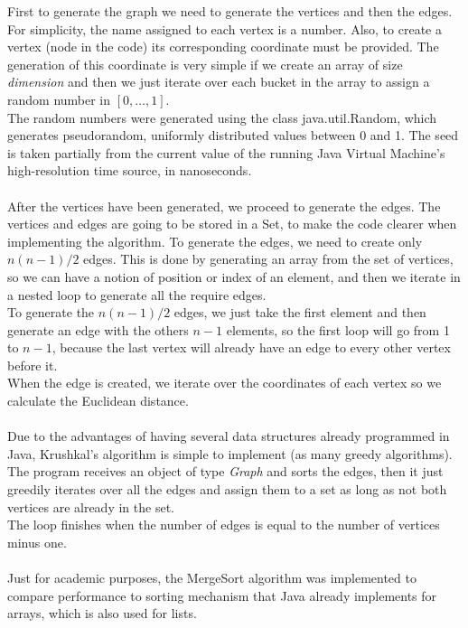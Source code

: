 \documentclass[tikz, 12pt]{scrartcl}
\begin{document}
First to generate the graph we need to generate the vertices and then the edges. For simplicity, the name assigned to each vertex is a number. Also, to create a vertex (node in the code) its corresponding coordinate must be provided. The generation of this coordinate is very simple if we create an array of size \textit{dimension} and then we just iterate over each bucket in the array to assign a random number in $[0, \ldots, 1].$\\
The random numbers were generated using the class java.util.Random, which generates pseudorandom, uniformly distributed  values between 0 and 1. The seed is taken partially from the current value of the running Java Virtual Machine's high-resolution time source, in nanoseconds.\\
\\
After the vertices have been generated, we proceed to generate the edges. The vertices and edges are going to be stored in a Set, to make the code clearer when implementing the algorithm. To generate the edges, we need to create only $n(n-1)/2$ edges. This is done by generating an array from the set of vertices, so we can have a notion of position or index of an element, and then we iterate in a nested loop to generate all the require edges.\\
To generate the $n(n-1 ) /2$ edges, we just take the first element and then generate an edge with the others $n - 1$ elements, so the first loop will go from 1 to $n -1$, because the last vertex will already have an edge to every other vertex before it. \\
When the edge is created, we iterate over the coordinates of each vertex so we calculate the Euclidean distance.\\
\\
Due to the advantages of having several data structures already programmed in Java, Krushkal's algorithm is simple to implement (as many greedy algorithms). The program receives an object of type \textit{Graph} and sorts the edges, then it just greedily iterates over all the edges and assign them to a set as long as not both vertices are already in the set.\\
The loop finishes when the number of edges is equal to the number of vertices minus one.\\
\\
Just for academic purposes, the MergeSort algorithm was implemented to compare performance to sorting mechanism that Java already implements for arrays, which is also used for lists.
\end{document}
